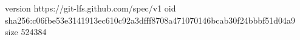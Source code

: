 version https://git-lfs.github.com/spec/v1
oid sha256:c06fbe53e3141913ec610c92a3dfff8708a471070146bcab30f24bbbf51d04a9
size 524384
